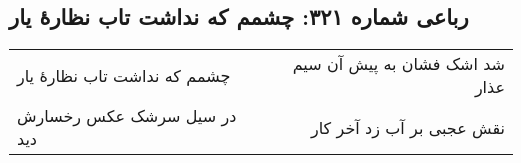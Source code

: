 \begin{center}
\section*{رباعی شماره ۳۲۱: چشمم که نداشت تاب نظارهٔ یار}
\label{sec:sh321}
\begin{longtable}{l p{0.5cm} r}
چشمم که نداشت تاب نظارهٔ یار
&&
شد اشک فشان به پیش آن سیم عذار
\\
در سیل سرشک عکس رخسارش دید
&&
نقش عجبی بر آب زد آخر کار
\\
\end{longtable}
\end{center}
